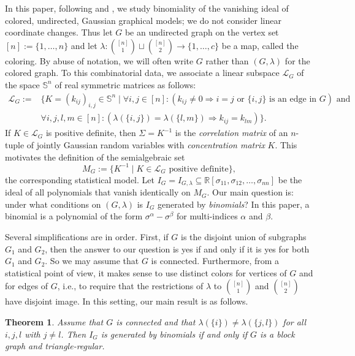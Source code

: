 \documentclass[a4paper, 11pt]{amsart}
\newtheorem{theorem}{Theorem}
\numberwithin{theorem}{section}
\newcommand{\cL}{\mathcal{L}}
\def\R{{\mathbb R}}
\def\S{{\mathbb S}}
\begin{document}
In this paper, following \cite{MS21} and \cite{CMMPS23}, we study
binomiality of the vanishing ideal of colored, undirected, Gaussian
graphical models; we do not consider linear coordinate changes. Thus let $G$ be an undirected graph on the vertex
set $[n]:=\{1,\ldots,n\}$ and let $\lambda: \binom{[n]}{1} \sqcup
\binom{[n]}{2} \to \{1,\ldots,c\}$ be a map, called the coloring. By
abuse of notation, we will often write $G$ rather than $(G,\lambda)$ for
the colored graph. To this combinatorial data, we associate a linear
subspace $\cL_G$ of the space $\S^n$ of real symmetric matrices as follows:
\begin{align*} 
\cL_G:=&\{K=(k_{ij})_{i,j} \in \S^n \mid \forall i,j \in [n]: 
(k_{ij} \neq 0 \Rightarrow i=j \text{ or } \{i,j\} \text{ is an edge in }
G) \text{ and }\\
&\forall i,j,l,m \in [n]: (\lambda(\{i,j\})=\lambda(\{l,m\}) \Rightarrow k_{ij}=k_{lm})\}. 
\end{align*}
If $K \in \cL_G$ is positive definite, then $\Sigma=K^{-1}$ is the {\em
correlation matrix} of an $n$-tuple of jointly Gaussian random variables
with {\em concentration matrix} $K$.  This motivates the definition of
the semialgebraic set
\[ M_G:=\{K^{-1} \mid K \in \cL_G \text{ positive definite}\}, \]
the corresponding statistical model. Let $I_G=I_{G,\lambda} \subseteq
\R[\sigma_{11},\sigma_{12},\ldots,\sigma_{nn}]$ be the ideal of all
polynomials that vanish identically on $M_G$. Our main question is: under
what conditions on $(G,\lambda)$ is $I_{G}$ generated by {\em
binomials}? In this paper, a binomial is a polynomial of the form 
$\sigma^\alpha - \sigma^\beta$ for multi-indices $\alpha$ and $\beta$.

Several simplifications are in order. First, if $G$ is the disjoint union
of subgraphs $G_1$ and $G_2$, then the answer to our question is yes if
and only if it is yes for both $G_1$ and $G_2$. So we may assume that $G$
is connected. Furthermore, from a statistical point of view, it makes
sense to use distinct colors for vertices of $G$ and for edges of $G$,
i.e., to require that the restrictions of $\lambda$ to ${\binom{[n]}{1}}$
and $\binom{[n]}{2}$ have disjoint image. In this setting, our main
result is as follows.

\begin{theorem} \label{thm:Main}
Assume that $G$ is connected and that $\lambda(\{i\}) \neq
\lambda(\{j,l\})$ for all $i,j,l$ with $j \neq l$. Then $I_{G}$ is generated by
binomials if and only if $G$ is a block graph and triangle-regular.
\end{theorem}
\end{document}
